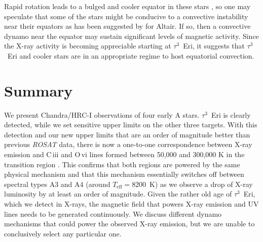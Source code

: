 \documentclass[preprint2]{aastex631}
\begin{document}
Rapid rotation leads to a bulged and cooler equator in these stars \citep[on Altair][resolved a temperature difference between pole and equator of at least 1000~K]{2007Sci...317..342M}, so one may speculate that some of the stars might be conducive to a convective instability near their equators as has been suggested by \citet{2009A&A...497..511R} for Altair. If so, then a convective dynamo near the equator may sustain significant levels of magnetic activity. Since the X-ray activity is becoming appreciable starting at $\tau^3$~Eri, it suggests that $\tau^3$~Eri and cooler stars are in an appropriate regime to host equatorial convection. 

\section{Summary}
\label{sec:summary}
We present Chandra/HRC-I observations of four early A stars. $\tau^3$~Eri is clearly detected, while we set sensitive upper limits on the other three targets. With this detection and our new upper limits that are an order of magnitude better than previous \emph{ROSAT} data, there is now a one-to-one correspondence between X-ray emission and C\,{\sc iii} and O\,{\sc vi} lines formed between 50,000 and 300,000 K in the transition region \citep{2002ApJ...579..800S}. This confirms that both regions are powered by the same physical mechanism and that this mechanism essentially switches off between spectral types A3 and A4 (around $T_\mathrm{eff}=8200$~K) as we observe a drop of X-ray luminosity by at least an order of magnitude. Given the rather old age of $\tau^3$~Eri, which we detect in X-rays, the magnetic field that powers X-ray emission and UV lines needs to be generated continuously. We discuss different dynamo mechanisms that could power the observed X-ray emission, but we are unable to conclusively select any particular one.
\end{document}
